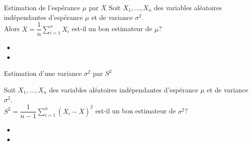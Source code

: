 \documentclass{BeamerTemplate}
\begin{document}
\begin{frame}[t]{Estimation de l'espérance $\mu$ par $\overline{X}$}
Soit $X_1,\ldots,X_n$ des variables aléatoires indépendantes d'espérance $\mu$ et de
variance $\sigma^2$. \\
Alors $ \overline{X} = \dfrac1n \sum\limits_{i=1}^{n}X_i$ est-il un bon estimateur de $\mu$?

\begin{itemize}
\item<1->  
\vfill

\item<2->  

\vfill
\end{itemize}
\end{frame}


\begin{frame}[t]{Estimation d'une variance $\sigma^2$ par $S^2$}

Soit $X_1,\ldots,X_n$ des variables aléatoires indépendantes d'espérance $\mu$ et de
variance $\sigma^2$. \\
${S}^2 = \dfrac{1}{n-1}\sum\limits_{i=1}^{n}(X_i-\overline{X})^2$ est-il un bon estimateur de $\sigma^2$?

\begin{itemize}
\item<1-> 
\vfill

\item<2->  

\end{itemize}

\end{frame}
\end{document}
